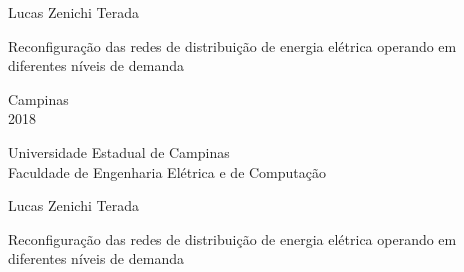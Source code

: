 \begin{titlepage}
    \vspace*{2.0cm}
    \begin{center}
    \large{Lucas Zenichi Terada}
    \end{center}
    
    
    \vspace*{4.8cm}
    
    \begin{center}
    {\sc \Large  Reconfiguração das redes de distribuição de energia elétrica operando em diferentes níveis de demanda}
    \end{center}
    
    
    \vspace*{3.25cm}
    
    
    \null \vfill
    
    \begin{center}
    Campinas\\2018
    \end{center}
\end{titlepage}

\begin{center}
\large Universidade Estadual de Campinas\\
Faculdade de Engenharia Elétrica e de Computação
\end{center}

\vspace*{1.0cm}
\begin{center}
\large Lucas Zenichi Terada
\end{center}

    
\vspace*{1.3cm}
    
\begin{center}
    {\sc Reconfiguração das redes de distribuição de energia elétrica operando em diferentes níveis de demanda}
\end{center}
    
\vspace*{0.5cm}

